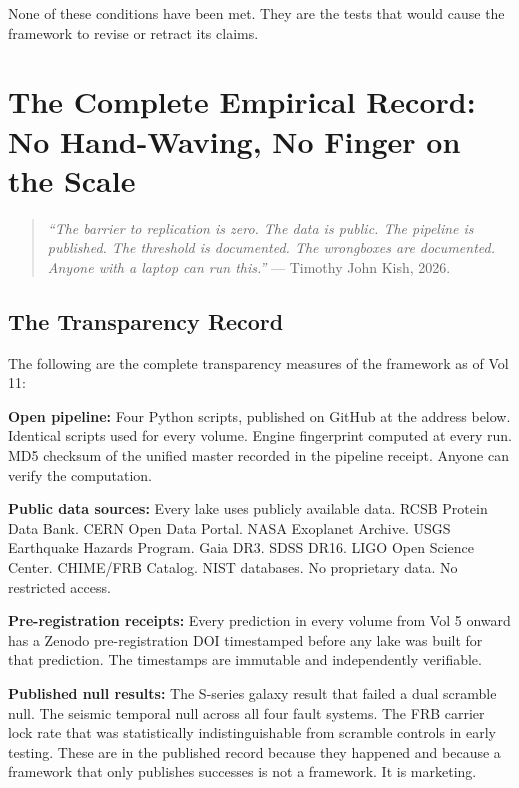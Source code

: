 \documentclass[11pt, letterpaper, openany]{book}
\begin{document}
None of these conditions have been met. They are the tests that
would cause the framework to revise or retract its claims.

\clearpage
\chapter{The Complete Empirical Record: No Hand-Waving, No Finger on the Scale}

\begin{quote}
\textit{``The barrier to replication is zero. The data is public.
The pipeline is published. The threshold is documented. The wrongboxes
are documented. Anyone with a laptop can run this.''} ---
Timothy John Kish, 2026.
\end{quote}

\section{The Transparency Record}

The following are the complete transparency measures of the framework
as of Vol 11:

\textbf{Open pipeline:} Four Python scripts, published on GitHub
at the address below. Identical scripts used for every volume.
Engine fingerprint computed at every run. MD5 checksum of the
unified master recorded in the pipeline receipt. Anyone can verify
the computation.

\textbf{Public data sources:} Every lake uses publicly available
data. RCSB Protein Data Bank. CERN Open Data Portal. NASA Exoplanet
Archive. USGS Earthquake Hazards Program. Gaia DR3. SDSS DR16.
LIGO Open Science Center. CHIME/FRB Catalog. NIST databases.
No proprietary data. No restricted access.

\textbf{Pre-registration receipts:} Every prediction in every volume
from Vol 5 onward has a Zenodo pre-registration DOI timestamped before
any lake was built for that prediction. The timestamps are immutable
and independently verifiable.

\textbf{Published null results:} The S-series galaxy result that
failed a dual scramble null. The seismic temporal null across all
four fault systems. The FRB carrier lock rate that was
statistically indistinguishable from scramble controls in early
testing. These are in the published record because they happened
and because a framework that only publishes successes is not a
framework. It is marketing.
\end{document}
